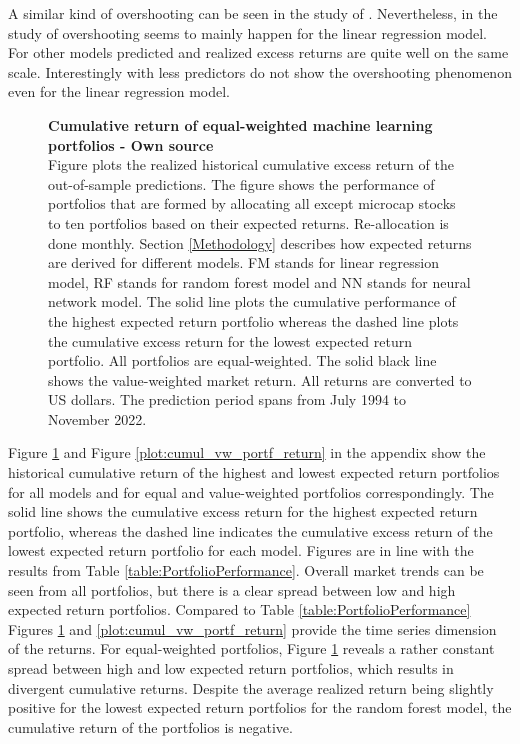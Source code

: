 \documentclass[12pt]{article}
\begin{document}
A similar kind of overshooting can be seen in the study of \citet{Drobetz}. Nevertheless, in the study of \citeauthor{Drobetz} overshooting seems to mainly happen for the linear regression model.\footnotemark {} For other models predicted and realized excess returns are quite well on the same scale. Interestingly with less predictors \citet{Fieberg} do not show the overshooting phenomenon even for the linear regression model.\footnotemark {} \par

\begin{figure}[ht]
\centering
\caption[Cumulative return of equal-weighted machine learning portfolios]{\textbf{Cumulative return of equal-weighted machine learning portfolios \textnormal{- Own source}}\\ Figure plots the realized historical cumulative excess return of the out-of-sample predictions. The figure shows the performance of portfolios that are formed by allocating all except microcap stocks to ten portfolios based on their expected returns. Re-allocation is done monthly. Section \ref{Methodology} describes how expected returns are derived for different models. FM stands for linear regression model, RF stands for random forest model and NN stands for neural network model. The solid line plots the cumulative performance of the highest expected return portfolio whereas the dashed line plots the cumulative excess return for the lowest expected return portfolio. All portfolios are equal-weighted. The solid black line shows the value-weighted market return. All returns are converted to US dollars. The prediction period spans from July 1994 to November 2022.}

\label{plot:cumul_ew_portf_return}
\end{figure}

Figure \ref{plot:cumul_ew_portf_return} and Figure \ref{plot:cumul_vw_portf_return} in the appendix show the historical cumulative return of the highest and lowest expected return portfolios for all models and for equal and value-weighted portfolios correspondingly. The solid line shows the cumulative excess return for the highest expected return portfolio, whereas the dashed line indicates the cumulative excess return of the lowest expected return portfolio for each model. Figures are in line with the results from Table \ref{table:PortfolioPerformance}. Overall market trends can be seen from all portfolios, but there is a clear spread between low and high expected return portfolios. Compared to Table \ref{table:PortfolioPerformance} Figures \ref{plot:cumul_ew_portf_return} and \ref{plot:cumul_vw_portf_return} provide the time series dimension of the returns. For equal-weighted portfolios, Figure \ref{plot:cumul_ew_portf_return} reveals a rather constant spread between high and low expected return portfolios, which results in divergent cumulative returns. Despite the average realized return being slightly positive for the lowest expected return portfolios for the random forest model, the cumulative return of the portfolios is negative. \par
\end{document}
